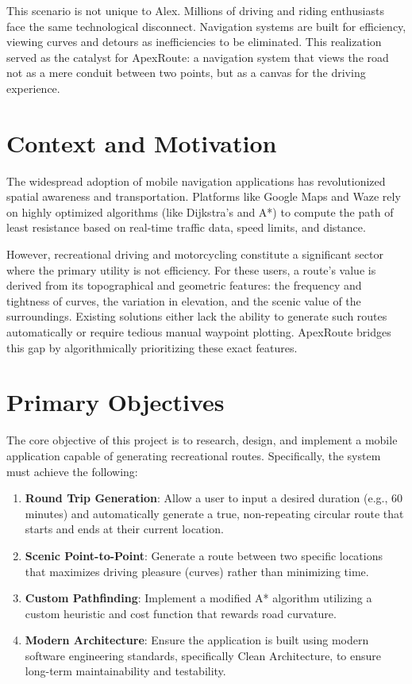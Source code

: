 \documentclass[12pt,a4paper,oneside]{report}
\begin{document}
This scenario is not unique to Alex. Millions of driving and riding enthusiasts face the same technological disconnect. Navigation systems are built for efficiency, viewing curves and detours as inefficiencies to be eliminated. This realization served as the catalyst for ApexRoute: a navigation system that views the road not as a mere conduit between two points, but as a canvas for the driving experience.

\section{Context and Motivation}
The widespread adoption of mobile navigation applications has revolutionized spatial awareness and transportation. Platforms like Google Maps and Waze rely on highly optimized algorithms (like Dijkstra's and A*) to compute the path of least resistance based on real-time traffic data, speed limits, and distance. 

However, recreational driving and motorcycling constitute a significant sector where the primary utility is not efficiency. For these users, a route's value is derived from its topographical and geometric features: the frequency and tightness of curves, the variation in elevation, and the scenic value of the surroundings. Existing solutions either lack the ability to generate such routes automatically or require tedious manual waypoint plotting. ApexRoute bridges this gap by algorithmically prioritizing these exact features.

\section{Primary Objectives}
The core objective of this project is to research, design, and implement a mobile application capable of generating recreational routes. Specifically, the system must achieve the following:
\begin{enumerate}
    \item \textbf{Round Trip Generation}: Allow a user to input a desired duration (e.g., 60 minutes) and automatically generate a true, non-repeating circular route that starts and ends at their current location.
    \item \textbf{Scenic Point-to-Point}: Generate a route between two specific locations that maximizes driving pleasure (curves) rather than minimizing time.
    \item \textbf{Custom Pathfinding}: Implement a modified A* algorithm utilizing a custom heuristic and cost function that rewards road curvature.
    \item \textbf{Modern Architecture}: Ensure the application is built using modern software engineering standards, specifically Clean Architecture, to ensure long-term maintainability and testability.
\end{enumerate}
\end{document}
